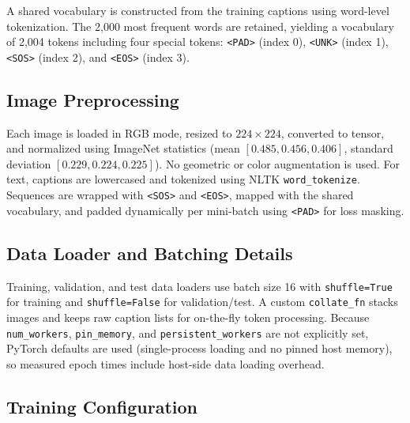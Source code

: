 \documentclass[conference]{IEEEtran}
\begin{document}
A shared vocabulary is constructed from the training captions using word-level tokenization. The 2{,}000 most frequent words are retained, yielding a vocabulary of 2{,}004 tokens including four special tokens: \texttt{<PAD>} (index 0), \texttt{<UNK>} (index 1), \texttt{<SOS>} (index 2), and \texttt{<EOS>} (index 3).

\subsection{Image Preprocessing}

Each image is loaded in RGB mode, resized to $224\times224$, converted to tensor, and normalized using ImageNet statistics (mean $[0.485, 0.456, 0.406]$, standard deviation $[0.229, 0.224, 0.225]$). No geometric or color augmentation is used. For text, captions are lowercased and tokenized using NLTK \texttt{word\_tokenize}. Sequences are wrapped with \texttt{<SOS>} and \texttt{<EOS>}, mapped with the shared vocabulary, and padded dynamically per mini-batch using \texttt{<PAD>} for loss masking.

\subsection{Data Loader and Batching Details}

Training, validation, and test data loaders use batch size 16 with \texttt{shuffle=True} for training and \texttt{shuffle=False} for validation/test. A custom \texttt{collate\_fn} stacks images and keeps raw caption lists for on-the-fly token processing. Because \texttt{num\_workers}, \texttt{pin\_memory}, and \texttt{persistent\_workers} are not explicitly set, PyTorch defaults are used (single-process loading and no pinned host memory), so measured epoch times include host-side data loading overhead.

\subsection{Training Configuration}
\end{document}
